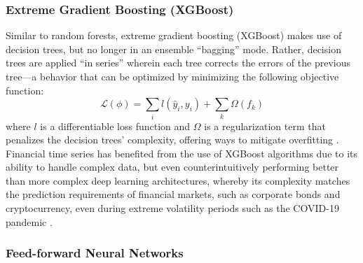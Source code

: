 \documentclass[stu,floatsintext]{apa7}
\begin{document}
\subsubsection{Extreme Gradient Boosting (XGBoost)}

Similar to random forests, extreme gradient boosting (XGBoost) makes use of decision trees, but no longer in an ensemble “bagging” mode. Rather, decision trees are applied “in series” wherein each tree corrects the errors of the previous tree—a behavior that can be optimized by minimizing the following objective function:
\begin{equation}\mathcal{L}(\phi) = \sum_i l(\hat{y}_i, y_i) + \sum_k \Omega(f_k)\end{equation}
where $l$ is a differentiable loss function and $\Omega$ is a regularization term that penalizes the decision trees’ complexity, offering ways to mitigate overfitting \parencite{chen2016xgboost}. Financial time series has benefited from the use of XGBoost algorithms due to its ability to handle complex data, but even counterintuitively performing better than more complex deep learning architectures, whereby its complexity matches the prediction requirements of financial markets, such as corporate bonds and cryptocurrency, even during extreme volatility periods such as the COVID-19 pandemic \parencite{zhangy2021study}.

\subsubsection{Feed-forward Neural Networks}
\end{document}
